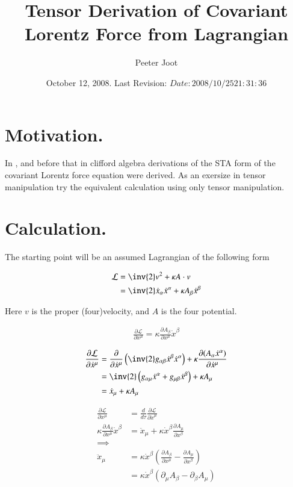 \documentclass{article}
\title{Tensor Derivation of Covariant Lorentz Force from Lagrangian}
\author{Peeter Joot}
\date{ October 12, 2008.  Last Revision: $Date: 2008/10/25 21:31:36 $ }
\newcommand{\LL}[0]{\mathcal{L}}
\newcommand{\xdot}[0]{\dot{x}}
\newcommand{\xddot}[0]{\ddot{x}}
\newcommand{\PD}[2]{\frac{\partial {#2}}{\partial {#1}}}
\begin{document}
\maketitle{}

\tableofcontents

\section{ Motivation. }

In \cite{PJSrLorentzForce}, and before that in \cite{PJSrLagrangian} clifford
algebra derivations of the STA form of the covariant Lorentz force equation
were derived.  As an exersize in tensor manipulation try the equivalent
calculation using only tensor manipulation.

\section{ Calculation. }

The starting point will be an assumed Lagrangian of the following form

\begin{align*}
\LL &= \inv{2} v^2 + \kappa A \cdot v \\
&= \inv{2} \xdot_\alpha \xdot^\alpha + \kappa A_\beta \xdot^\beta
\end{align*}

Here $v$ is the proper (four)velocity, and $A$ is the four potential.

\begin{align*}
\PD{x^\mu}{\LL} = \kappa \PD{x^\mu}{A_\beta} \xdot^\beta
\end{align*}

\begin{align*}
\PD{\xdot^\mu}{\LL}
&= \PD{\xdot^\mu}{} \left( \inv{2} g_{\alpha\beta} \xdot^\beta \xdot^\alpha \right) + \kappa \PD{\xdot^\mu}{(A_\alpha \xdot^\alpha)} \\
&= \inv{2} \left( g_{\alpha\mu} \xdot^\alpha +g_{\mu\beta} \xdot^\beta \right) + \kappa A_\mu \\
&= \xdot_\mu + \kappa A_\mu \\
\end{align*}

\begin{align*}
\PD{x^\mu}{\LL} &= \frac{d}{d\tau} \PD{\xdot^\mu}{\LL} \\
\kappa \PD{x^\mu}{A_\beta} \xdot^\beta &= \xddot_\mu + \kappa \xdot^\beta \PD{x^\beta}{A_\mu} \\
\implies \\
\xddot_\mu
&= \kappa \xdot^\beta \left( \PD{x^\mu}{A_\beta} - \PD{x^\beta}{A_\mu} \right) \\
&= \kappa \xdot^\beta \left( \partial_\mu {A_\beta} - \partial_{\beta}{A_\mu} \right) \\
\end{align*}
\end{document}
